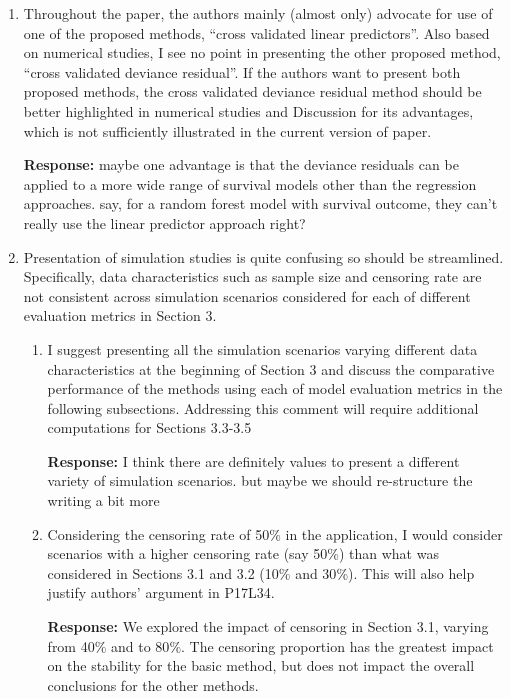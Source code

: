 \documentclass[12]{article}
\newcommand{\re}{\textbf{Response: }}
\newcommand\bd[1]{{\color{blue}#1}}
\begin{document}
\begin{enumerate}[align = left]
\item Throughout the paper, the authors mainly (almost only) advocate for use of one of the proposed methods, “cross validated linear predictors”. Also based on numerical studies, I see no point in presenting the other proposed method, “cross validated deviance residual”. If the authors want to present both proposed methods, the cross validated deviance residual method should be better highlighted in numerical studies and Discussion for its advantages, which is not sufficiently illustrated in the current version of paper.

\re \bd{maybe one advantage is that the deviance residuals can be applied to a more wide range of survival models other than the regression approaches. say, for a random forest model with survival outcome, they can't really use the linear predictor approach right?}

\item Presentation of simulation studies is quite confusing so should be streamlined. Specifically, data characteristics such as sample size and censoring rate are not consistent across simulation scenarios considered for each of different evaluation metrics in Section 3.

    \begin{enumerate}
    \item I suggest presenting all the simulation scenarios varying different data characteristics at the beginning of Section 3 and discuss the comparative performance of the methods using each of model evaluation metrics in the following subsections. Addressing this comment will require additional computations for Sections 3.3-3.5
    
    \re \bd{I think there are definitely values to present a different variety of simulation scenarios. but maybe we should re-structure the writing a bit more}

    \item Considering the censoring rate of 50$\%$ in the application, I would consider scenarios with a higher censoring rate (say 50$\%$) than what was considered in Sections 3.1 and 3.2 (10$\%$ and 30$\%$). This will also help justify authors’ argument in P17L34. 
    
    \re We explored the impact of censoring in Section 3.1, varying from 40$\%$ and to 80$\%$. The censoring proportion has the greatest impact on the stability for the basic method, but does not impact the overall conclusions for the other methods.


\end{enumerate}
\end{enumerate}
\end{document}
